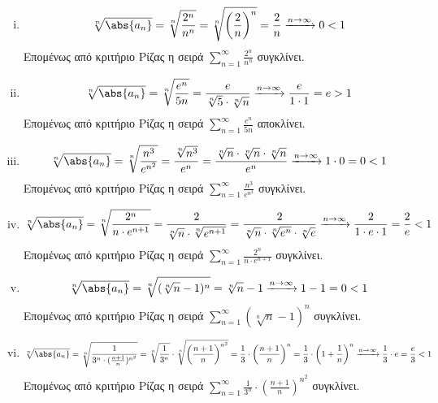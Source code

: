 \begin{enumerate}
\begin{enumerate}[i)]
      \item 
        \[
          \sqrt[n]{\abs{a_{n}}} = \sqrt[n]{\frac{2^{n}}{n^{n}}} = 
          \sqrt[n]{\left(\frac{2}{n} \right)^{n}} = \frac{2}{n} 
          \xrightarrow{n \to \infty} 0 < 1
        \] 
        Επομένως από κριτήριο Ρίζας η σειρά $ \sum_{n=1}^{\infty} 
        \frac{2^{n}}{n^{n}} $ συγκλίνει.

      \item 
        \[
          \sqrt[n]{\abs{a_{n}}} = \sqrt[n]{\frac{e^{n}}{5n}} = 
          \frac{e}{\sqrt[n]{5} \cdot \sqrt[n]{n}} \xrightarrow{n \to \infty} 
          \frac{e}{1 \cdot 1} = e>1
        \] 
        Επομένως από κριτήριο Ρίζας η σειρά 
        $ \sum_{n=1}^{\infty} \frac{e^{n}}{5n} $ αποκλίνει.

      \item 
        \[
          \sqrt[n]{\abs{a_{n}}} = \sqrt[n]{\frac{n^{3}}{e^{n^{2}}}} = 
          \frac{\sqrt[n]{n^{3}} }{e^{n}} = \frac{\sqrt[n]{n} \cdot 
          \sqrt[n]{n} \cdot \sqrt[n]{n}}{e^{n}} \xrightarrow{n \to \infty} 
          1\cdot 0 = 0 <1
        \] 
        Επομένως από κριτήριο Ρίζας η σειρά 
        $ \sum_{n=1}^{\infty} \frac{n^{3}}{e^{n^{2}}} $ συγκλίνει.

      \item 
        \[
          \sqrt[n]{\abs{a_{n}}} = \sqrt[n]{\frac{2^{n}}{n\cdot e^{n+1}}} = 
          \frac{2}{\sqrt[n]{n} \cdot \sqrt[n]{e^{n+1}}} = 
          \frac{2}{\sqrt[n]{n} \cdot \sqrt[n]{e^{n}}\cdot \sqrt[n]{e}}
          \xrightarrow{n \to \infty} \frac{2}{1 \cdot e \cdot 1} = 
          \frac{2}{e} <1
        \] 
        Επομένως από κριτήριο Ρίζας η σειρά 
        $ \sum_{n=1}^{\infty} \frac{2^{n}}{n \cdot e^{n+1}} $ συγκλίνει.

      \item 
        \[
          \sqrt[n]{\abs{a_{n}}} = \sqrt[n]{(\sqrt[n]{n} -1)^{n}} = 
          \sqrt[n]{n} - 1 \xrightarrow{n \to \infty} 1-1=0 <1
        \]
        Επομένως από κριτήριο Ρίζας η σειρά 
        $ \sum_{n=1}^{\infty} (\sqrt[n]{n} -1)^{n} $ συγκλίνει.

      \item 
        \[
          \sqrt[n]{\abs{a_{n}}} = \sqrt[n]{\frac{1}{3^{n} 
          \cdot (\frac{n+1}{n})^{n^{2}}}} = \sqrt[n]{\frac{1}{3^{n}}} 
          \cdot \sqrt[n]{\left(\frac{n+1}{n} \right)^{n^{2}}} = 
          \frac{1}{3} \cdot \left(\frac{n+1}{n} \right)^{n} = \frac{1}{3} 
          \cdot \left(1+ \frac{1}{n} \right)^{n} \xrightarrow{n \to \infty} 
          \frac{1}{3} \cdot e = \frac{e}{3} <1 
        \] 
        Επομένως από κριτήριο Ρίζας η σειρά 
        $ \sum_{n=1}^{\infty} \frac{1}{3^{n}} \cdot 
        \left(\frac{n+1}{n} \right)^{n^{2}} $ συγκλίνει.


\end{enumerate}
\end{enumerate}
